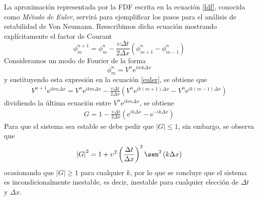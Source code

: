 \documentclass[11pt,twoside,openright,spanish]{report}
\numberwithin{equation}{chapter}
\numberwithin{figure}{chapter}
\numberwithin{table}{chapter}
\renewcommand{\sin}{\operatorname{\sen}}
\begin{document}
La aproximación representada por la FDF escrita en la ecuación \eqref{fdf}, conocida como \textit{Método de Euler}, servirá para ejemplificar los pasos para el análisis de estabilidad de Von Neumann. Reescribimos dicha ecuación mostrando explícitamente el factor de Courant
\begin{equation}
\phi_m^{n+1}=\phi^n_m-\frac{\upsilon\Delta t}{2\Delta x}\left(\phi_{m+1}^n-\phi_{m-1}^n\right)
\label{euler}
\end{equation}
Consideramos un  modo de Fourier de la forma
\begin{equation}
\phi^n_m=V^n\text{e}^{imk\Delta x}
\end{equation}
y sustituyendo esta expresión en la ecuación \eqref{euler}, se obtiene que
\begin{align}
V^{n+1}\text{e}^{ikm\Delta x}=V^n\text{e}^{ikm\Delta x}-\frac{\upsilon \Delta t}{2\Delta x}\left(V^n\text{e}^{ik(m+1)\Delta x}-V^n\text{e}^{ik(m-1)\Delta x}\right)
\end{align}
dividiendo la última ecuación entre $V^n\text{e}^{ikm\Delta x}$, se obtiene
\begin{align}
G=1-\frac{\upsilon\Delta t}{2\Delta x}\left(\text{e}^{ik\Delta x}-\text{e}^{-ik\Delta x}\right)
\end{align}
Para que el sistema sea estable se debe pedir que $\left|G\right|\leq 1$, sin embargo, se observa que
\begin{equation}
\left|G\right|^2=1+\upsilon^2\left(\frac{\Delta t}{\Delta x}\right)^2\sin^2\left(k\Delta x\right)
\end{equation}
ocasionando que $\left|G\right|\geq 1$ para cualquier $k$, por lo que se concluye que el sistema es incondicionalmente inestable, es decir, inestable para cualquier elección de $\Delta t$ y $\Delta x$.
\end{document}
